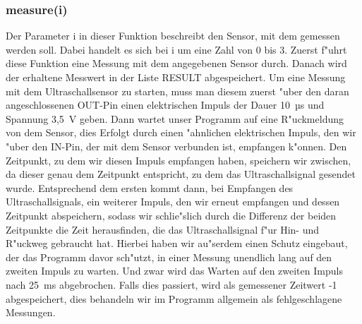 \documentclass[a4paper,12pt]{article}
\begin{document}
\subsubsection{measure(i)}\label{sec2.2.4}

Der Parameter i in dieser Funktion beschreibt den Sensor, mit dem gemessen werden soll.
Dabei handelt es sich bei i um eine Zahl von 0 bis 3.
Zuerst f"uhrt diese Funktion eine Messung mit dem angegebenen Sensor durch.
Danach wird der erhaltene Messwert in der Liste RESULT abgespeichert.
Um eine Messung mit dem Ultraschallsensor zu starten, muss man diesem zuerst "uber den daran angeschlossenen OUT-Pin einen elektrischen Impuls der Dauer 10~µs und Spannung 3,5~V geben.
Dann wartet unser Programm auf eine R"uckmeldung von dem Sensor, dies Erfolgt durch einen "ahnlichen elektrischen Impuls, den wir "uber den IN-Pin, der mit dem Sensor verbunden ist, empfangen k"onnen.
Den Zeitpunkt, zu dem wir diesen Impuls empfangen haben, speichern wir zwischen, da dieser genau dem Zeitpunkt entspricht, zu dem das Ultraschallsignal gesendet wurde.
Entsprechend dem ersten kommt dann, bei Empfangen des Ultraschallsignals, ein weiterer Impuls, den wir erneut empfangen und dessen Zeitpunkt abspeichern, sodass wir schlie"slich durch die Differenz der beiden Zeitpunkte die Zeit herausfinden, die das Ultraschallsignal f"ur Hin- und R"uckweg gebraucht hat.
Hierbei haben wir au"serdem einen Schutz eingebaut, der das Programm davor sch"utzt, in einer Messung unendlich lang auf den zweiten Impuls zu warten.
Und zwar wird das Warten auf den zweiten Impuls nach 25~ms abgebrochen.
Falls dies passiert, wird als gemessener Zeitwert -1 abgespeichert, dies behandeln wir im Programm allgemein als fehlgeschlagene Messungen.
\end{document}
